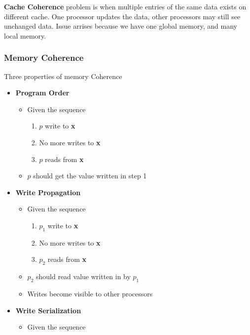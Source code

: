 \documentclass{article}
\begin{document}
\textbf{Cache Coherence} problem is when multiple entries of the same data exists on different cache.
One processor updates the data, other processors may still see unchanged data.
Issue arrises because we have one global memory, and many local memory.

\subsubsection{Memory Coherence}
Three properties of memory Coherence
\begin{itemize}
    \item \textbf{Program Order}
          \begin{itemize}
              \item Given the sequence
                    \begin{enumerate}
                        \item $p$ write to \textbf{x}
                        \item No more writes to \textbf{x}
                        \item $p$ reads from \textbf{x}
                    \end{enumerate}
              \item $p$ should get the value written in step 1
          \end{itemize}
    \item \textbf{Write Propagation}
          \begin{itemize}
              \item Given the sequence
                    \begin{enumerate}
                        \item $p_1$ write to \textbf{x}
                        \item No more writes to \textbf{x}
                        \item $p_2$ reads from \textbf{x}
                    \end{enumerate}
              \item $p_2$ should read value written in by $p_1$
              \item Writes become visible to other processors
          \end{itemize}
    \item \textbf{Write Serialization}
          \begin{itemize}
              \item Given the sequence
                    \begin{enumerate}

\end{enumerate}
\end{itemize}
\end{itemize}
\end{document}
